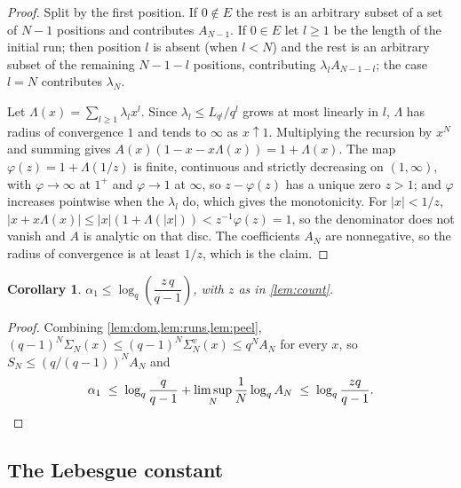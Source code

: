 \documentclass[11pt]{amsart}
\newtheorem{corollary}[theorem]{Corollary}
\theoremstyle{definition}
\theoremstyle{remark}
\begin{document}
\begin{proof}
Split by the first position. If $0 \notin E$ the rest is an arbitrary subset of a set of $N-1$ positions and contributes $A_{N-1}$. If $0 \in E$ let $l \ge 1$ be the length of the initial run; then position $l$ is absent (when $l < N$) and the rest is an arbitrary subset of the remaining $N-1-l$ positions, contributing $\lambda_{l}A_{N-1-l}$; the case $l = N$ contributes $\lambda_{N}$.

Let $\Lambda(x) = \sum_{l \ge 1}\lambda_{l}x^{l}$. Since $\lambda_{l} \le L_{q^{l}}/q^{l}$ grows at most linearly in $l$, $\Lambda$ has radius of convergence $1$ and tends to $\infty$ as $x \uparrow 1$. Multiplying the recursion by $x^{N}$ and summing gives $A(x)\left(1 - x - x\Lambda(x)\right) = 1 + \Lambda(x)$. The map $\varphi(z) = 1 + \Lambda(1/z)$ is finite, continuous and strictly decreasing on $(1,\infty)$, with $\varphi \to \infty$ at $1^{+}$ and $\varphi \to 1$ at $\infty$, so $z - \varphi(z)$ has a unique zero $z > 1$; and $\varphi$ increases pointwise when the $\lambda_{l}$ do, which gives the monotonicity. For $|x| < 1/z$, $|x + x\Lambda(x)| \le |x|(1 + \Lambda(|x|)) < z^{-1}\varphi(z) = 1$, so the denominator does not vanish and $A$ is analytic on that disc. The coefficients $A_{N}$ are nonnegative, so the radius of convergence is at least $1/z$, which is the claim.
\end{proof}

\begin{corollary}
\label{cor:sigmabound}
$\alpha_{1} \le \log_{q}\!\left(\dfrac{z\,q}{q-1}\right)$, with $z$ as in \cref{lem:count}.
\end{corollary}

\begin{proof}
Combining \cref{lem:dom,lem:runs,lem:peel}, $(q-1)^{N}\Sigma_{N}(x) \le (q-1)^{N}\Sigma^{v}_{N}(x) \le q^{N}A_{N}$ for every $x$, so $S_{N} \le (q/(q-1))^{N}A_{N}$ and
\[
  \alpha_{1} \;\le\; \log_{q}\frac{q}{q-1} + \limsup_{N}\frac{1}{N}\log_{q}A_{N} \;\le\; \log_{q}\frac{zq}{q-1}. \qedhere
\]
\end{proof}

\subsection{The Lebesgue constant}
\end{document}
